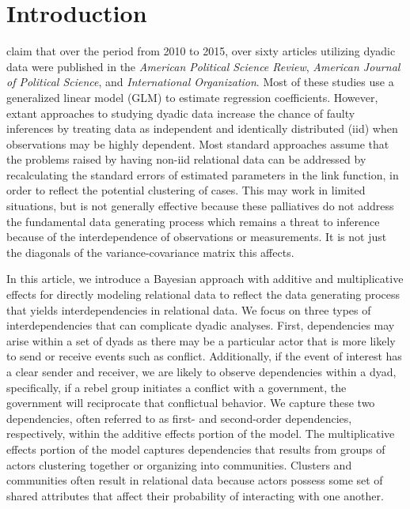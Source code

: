 \section{\textbf{Introduction}}

\citet{aronow:etal:2015} claim that over the period from 2010 to 2015, over sixty articles utilizing dyadic data were published in the \textit{American Political Science Review}, \textit{American Journal of Political Science}, and \textit{International Organization}. Most of these studies  use a generalized linear model (GLM) to estimate regression coefficients.  However, extant approaches to studying dyadic data increase the chance of faulty inferences by treating data as independent and identically distributed (iid) when observations may be highly dependent. Most standard approaches assume that the problems raised by having non-iid relational data can be addressed by recalculating the standard errors of estimated parameters in the link function, in order to reflect the potential clustering of cases. This may work in limited situations, but is not generally effective because these palliatives do not address the fundamental data generating process which remains a threat to inference because of the interdependence of observations or measurements. It is not just the diagonals of the variance-covariance matrix this affects.

In this article, we introduce a Bayesian approach with additive and multiplicative effects for directly modeling relational data to reflect the data generating process that yields interdependencies in relational data. We focus on three types of interdependencies that can complicate dyadic analyses. First, dependencies may arise within a set of dyads as there may be a particular actor that is more likely to send or receive events such as conflict. Additionally, if the event of interest has a clear sender and receiver, we are likely to observe dependencies within a dyad, specifically, if a rebel group initiates a conflict with a government, the government will reciprocate that conflictual behavior. We capture these two dependencies, often referred to as first- and second-order dependencies, respectively, within the additive effects portion of the model. The multiplicative effects portion of the model captures dependencies that results from groups of actors clustering together or organizing into communities. Clusters and communities often result in relational data because actors possess some set of shared attributes that affect their probability of interacting with one another. 

